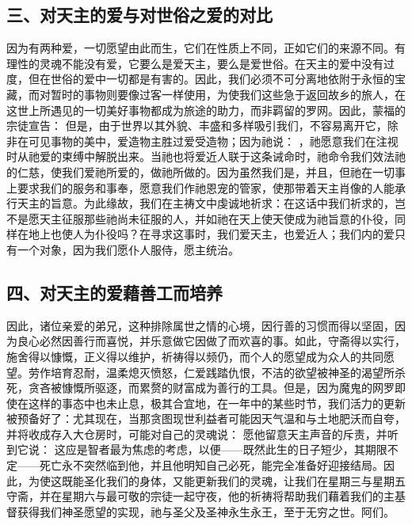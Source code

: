 
\subsection{三、对天主的爱与对世俗之爱的对比}

因为有两种爱，一切愿望由此而生，它们在性质上不同，正如它们的来源不同。有理性的灵魂不能没有爱，它要么是爱天主，要么是爱世俗。在天主的爱中没有过度，但在世俗的爱中一切都是有害的。因此，我们必须不可分离地依附于永恒的宝藏，而对暂时的事物则要像过客一样使用，为使我们这些急于返回故乡的旅人，在这世上所遇见的一切美好事物都成为旅途的助力，而非羁留的罗网。因此，蒙福的宗徒宣告：  但是，由于世界以其外貌、丰盛和多样吸引我们，不容易离开它，除非在可见事物的美中，爱造物主胜过爱受造物；因为祂说：  ，祂愿意我们在注视时从祂爱的束缚中解脱出来。当祂也将爱近人联于这条诫命时，祂命令我们效法祂的仁慈，使我们爱祂所爱的，做祂所做的。因为虽然我们是，并且，但祂在一切事上要求我们的服务和事奉，愿意我们作祂恩宠的管家，使那带着天主肖像的人能承行天主的旨意。为此缘故，我们在主祷文中虔诚地祈求：在这话中我们祈求的，岂不是愿天主征服那些祂尚未征服的人，并如祂在天上使天使成为祂旨意的仆役，同样在地上也使人为仆役吗？在寻求这事时，我们爱天主，也爱近人；我们内的爱只有一个对象，因为我们愿仆人服侍，愿主统治。\par


\subsection{四、对天主的爱藉善工而培养}

因此，诸位亲爱的弟兄，这种排除属世之情的心境，因行善的习惯而得以坚固，因为良心必然因善行而喜悦，并乐意做它因做了而欢喜的事。如此，守斋得以实行，施舍得以慷慨，正义得以维护，祈祷得以频仍，而个人的愿望成为众人的共同愿望。劳作培育忍耐，温柔熄灭愤怒，仁爱践踏仇恨，不洁的欲望被神圣的渴望所杀死，贪吝被慷慨所驱逐，而累赘的财富成为善行的工具。但是，因为魔鬼的网罗即使在这样的事态中也未止息，极其合宜地，在一年中的某些时节，我们活力的更新被预备好了：尤其现在，当那贪图现世利益者可能因天气温和与土地肥沃而自夸，并将收成存入大仓房时，可能对自己的灵魂说： 愿他留意天主声音的斥责，并听到它说： 这应是智者最为焦虑的考虑，以便——既然此生的日子短少，其期限不定——死亡永不突然临到他，并且他明知自己必死，能完全准备好迎接结局。因此，为使这既能圣化我们的身体，又能更新我们的灵魂，让我们在星期三与星期五守斋，并在星期六与最可敬的宗徒一起守夜，他的祈祷将帮助我们藉着我们的主基督获得我们神圣愿望的实现，祂与圣父及圣神永生永王，至于无穷之世。阿们。\par

